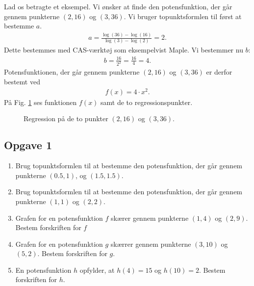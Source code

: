 \begin{exa}
Lad os betragte et eksempel. Vi ønsker at finde den potensfunktion, der går gennem punkterne $(2,16)$ og  $(3,36)$. 
Vi bruger topunktsformlen til først at bestemme $a$.
\begin{align*}
a = \frac{\log(36)-\log(16)}{\log(3)-\log(2)} = 2.
\end{align*}
Dette bestemmes med CAS-værktøj som eksempelvist Maple. 
Vi bestemmer nu $b$:
\begin{align*}
b = \frac{16}{2^2} = \frac{16}{4} = 4.
\end{align*}
Potensfunktionen, der går gennem punkterne  $(2,16)$ og  $(3,36)$ er derfor bestemt ved
\begin{align*}
f(x) = 4\cdot x^2.
\end{align*}
På Fig. \ref{fig:topunktpotens} ses funktionen $f(x)$ samt de to regressionspunkter. 
\begin{figure}[H]
\centering
{}
\caption{Regression på de to punkter $(2,16)$ og $(3,36)$.}
\label{fig:topunktpotens}
\end{figure}
\end{exa}
\subsection*{Opgave 1}
\begin{enumerate}[label=\roman*)]

\item Brug topunktsformlen til at bestemme den potensfunktion, der går gennem punkterne $(0.5,1)$, og $(1.5,1.5)$.
\item Brug topunktsformlen til at bestemme den potensfunktion, der går gennem punkterne $(1,1)$ og $(2,2)$.

\item Grafen for en potensfunktion $f$ skærer gennem punkterne $(1,4)$ og $(2,9)$. Bestem forskriften for $f$
\item Grafen for en potensfunktion $g$ skærrer gennem punkterne $(3,10)$ og $(5,2)$. Bestem forskriften for $g$.
\item En potensfunktion $h$ opfylder, at $h(4)=15$ og $h(10) = 2$. Bestem forskriften for $h$.
\end{enumerate}

